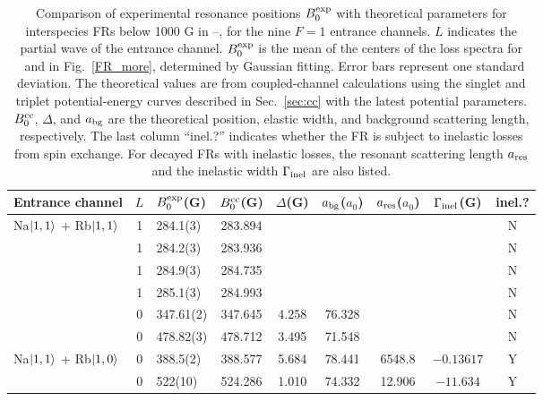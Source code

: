 \begin{sidewaystable}[thp]
\caption[Summary table of Na-Rb Feshbach resonances with different spin combinations]{Comparison of experimental resonance positions $B_0^{\rm exp}$ with theoretical parameters for interspecies FRs below 1000 G in \Na--\Rb, for the nine $F = 1$ entrance channels. $L$ indicates the partial wave of the entrance channel. $B_0^{\rm exp}$ is the mean of the centers of the loss spectra for \Na\ and \Rb in Fig.~\ref{FR_more}, determined by Gaussian fitting. Error bars represent one standard deviation. The theoretical values are from coupled-channel calculations using the singlet and triplet potential-energy curves described in Sec.~\ref{sec:cc} with the latest potential parameters. $B_0^{\rm cc}$, $\Delta$, and $a_{\rm bg}$ are the theoretical position, elastic width, and background scattering length, respectively. The last column ``inel.?'' indicates whether the FR is subject to inelastic losses from spin exchange. For decayed FRs with inelastic losses, the resonant scattering length $a_{\rm res}$ and the inelastic width $\Gamma_{\rm inel}$ are also listed.}
\label{fst}\centering
\begin{tabular}{l|c|l|c|c|c|c|c|c}
\hline\hline
Entrance channel 				& $L$ & $B_0^{\rm exp}$(G)	& $B_0^{\rm cc}$(G)	& $\Delta$(G)	& $a_{\rm bg}$($a_0$) & $a_{\rm res}$($a_0$) & $\Gamma_{\rm inel}$(G)	& inel.? \\
\hline
Na$\ket{1,1}$ + Rb$\ket{1,1}$   & 1 	& 284.1(3)        	& 283.894			&   						 &   		& & & N     \\
						    	& 1    	& 284.2(3)         	& 283.936 			& 	&       							 & & & N     \\
    							& 1    	& 284.9(3)         	& 284.735 			&   &         							 & & & N     \\
    							& 1    	& 285.1(3)          & 284.993 			&   &         							 & & & N     \\
								& 0    	& 347.61(2)       	& 347.645 			& 4.258  			 & 76.328  	& & & N     \\
					        	& 0 	& 478.82(3)        	& 478.712 			& 3.495  			 & 71.548   & & & N     \\ \hline
Na$\ket{1,1}$ + Rb$\ket{1,0}$   & 0    	& 388.5(2)          & 388.577 			& 5.684  & 78.441                 &6548.8 & $-0.13617$& Y     \\
								& 0    	& 522(10)           & 524.286 			& 1.010  & 74.332                 & 12.906& $-11.634$& Y     \\ \hline

\end{tabular}
\end{sidewaystable}
